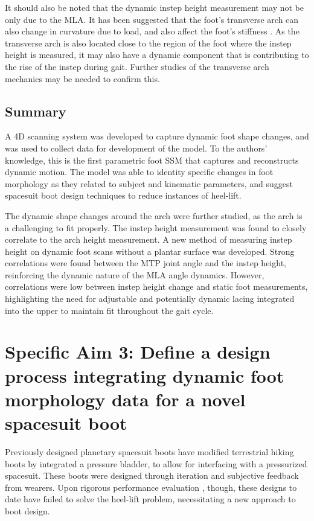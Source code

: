 \documentclass[defaultstyle,11pt]{thesis}
\begin{document}
It should also be noted that the dynamic instep height measurement may not be only due to the MLA.
It has been suggested that the foot's transverse arch can also change in curvature due to load, and also affect the foot's stiffness \citep{Venkadesan2020}.
As the transverse arch is also located close to the region of the foot where the instep height is measured, it may also have a dynamic component that is contributing to the rise of the instep during gait.
Further studies of the transverse arch mechanics may be needed to confirm this.

\hypertarget{summary-3}{%
\section{Summary}\label{summary-3}}

A 4D scanning system was developed to capture dynamic foot shape changes, and was used to collect data for development of the model.
To the authors' knowledge, this is the first parametric foot SSM that captures and reconstructs dynamic motion.
The model was able to identity specific changes in foot morphology as they related to subject and kinematic parameters, and suggest spacesuit boot design techniques to reduce instances of heel-lift.

The dynamic shape changes around the arch were further studied, as the arch is a challenging to fit properly.
The instep height measurement was found to closely correlate to the arch height measurement.
A new method of measuring instep height on dynamic foot scans without a plantar surface was developed.
Strong correlations were found between the MTP joint angle and the instep height, reinforcing the dynamic nature of the MLA angle dynamics.
However, correlations were low between instep height change and static foot measurements, highlighting the need for adjustable and potentially dynamic lacing integrated into the upper to maintain fit throughout the gait cycle.

\hypertarget{sec:SA3}{%
\chapter{Specific Aim 3: Define a design process integrating dynamic foot morphology data for a novel spacesuit boot}\label{sec:SA3}}

Previously designed planetary spacesuit boots have modified terrestrial hiking boots by integrated a pressure bladder, to allow for interfacing with a pressurized spacesuit.
These boots were designed through iteration and subjective feedback from wearers.
Upon rigorous performance evaluation \citep{Ross2002, Fineman2018}, though, these designs to date have failed to solve the heel-lift problem, necessitating a new approach to boot design.
\end{document}
